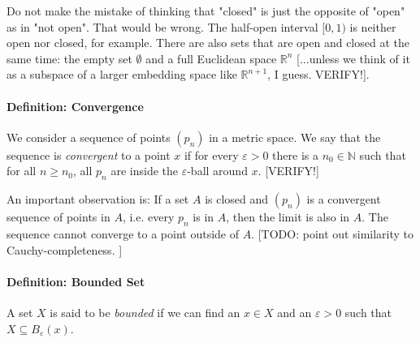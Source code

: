 \medskip
Do not make the mistake of thinking that "closed" is just the opposite of "open" as in "not open". That would be wrong. The half-open interval $[0,1)$ is neither open nor closed, for example. There are also sets that are open and closed at the same time: the empty set $\emptyset$ and a full Euclidean space $\mathbb{R}^n$ [...unless we think of it as a subspace of a larger embedding space like $\mathbb{R}^{n+1}$, I guess. VERIFY!]. 



\paragraph{Definition: Convergence} We consider a sequence of points $(p_n)$ in a metric space. We say that the sequence is \emph{convergent} to a point $x$ if for every $\varepsilon > 0$ there is a $n_0 \in \mathbb{N}$ such that for all $n \geq n_0$, all $p_n$ are inside the $\varepsilon$-ball around $x$. [VERIFY!]

\medskip
An important observation is: If a set $A$ is closed and $(p_n)$ is a convergent sequence of points in $A$, i.e. every $p_n$ is in $A$, then the limit is also in $A$. The sequence cannot converge to a point outside of $A$. [TODO: point out similarity to Cauchy-completeness. ]





% 


\paragraph{Definition: Bounded Set} A set $X$ is said to be \emph{bounded} if we can find an $x \in X$ and an $\varepsilon > 0$ such that $X \subseteq B_\varepsilon(x)$. 


